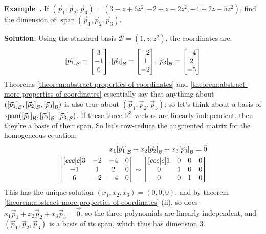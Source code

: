 \documentclass[11pt, letterpaper]{report}
\newenvironment{notes}{}{}
\newenvironment{book}{}{}
\let\originalleft\left
\let\originalright\right
\renewcommand{\left}{\mathopen{}\mathclose\bgroup\originalleft}
\renewcommand{\right}{\aftergroup\egroup\originalright}
\newcounter{example}[section]
\newcommand{\example}{\refstepcounter{example}%
\par\noindent\textbf{Example~\theexample.} }
\newcounter{theorem}[chapter]
\newcommand{\R}{\mathbb{R}}
\DeclareMathOperator{\spn}{span}
\newcommand{\bbbvec}[3]{
  \begin{bmatrix} #1 \\ #2 \\ #3 \end{bmatrix}
}
\begin{document}
\example If $( \vec{p}_1,\vec{p}_2,\vec{p}_3 ) = ( 3-z+6z^2,-2+z-2z^2, -4 + 2z-5z^2 )$, find the dimension of $\spn ( \vec{p}_1,\vec{p}_2,\vec{p}_3 )$.

\begin{notes}
\vspace{20em}
\end{notes}

\begin{book}
\textbf{Solution.} Using the standard basis $\mathcal{B} = (1,z,z^2)$, the coordinates are:
\[\left[ \vec{p}_1 \right]_{\mathcal{B}}=\bbbvec{3}{-1}{6}, \left[ \vec{p}_2 \right]_{\mathcal{B}}=\bbbvec{-2}{1}{-2},\left[ \vec{p}_3 \right]_{\mathcal{B}}=\bbbvec{-4}{2}{-5}\]
Theorems \ref{theorem:abstract-properties-of-coordinates} and \ref{theorem:abstract-more-properties-of-coordinates} essentially say that anything about $( \left[\vec{p}_1\right]_{\mathcal{B}},\left[\vec{p}_2\right]_{\mathcal{B}},\left[\vec{p}_3\right]_{\mathcal{B}} )$ is also true about $( \vec{p}_1,\vec{p}_2,\vec{p}_3 )$; so let's think about a basis of $\spn( \left[\vec{p}_1\right]_{\mathcal{B}},\left[\vec{p}_2\right]_{\mathcal{B}},\left[\vec{p}_3\right]_{\mathcal{B}} )$. If these three $\R^3$ vectors are linearly independent, then they're a basis of their span. So let's row-reduce the augmented matrix for the homogeneous equation:
\begin{align*}
x_1\left[\vec{p}_1\right]_{\mathcal{B}}+x_2\left[\vec{p}_2\right]_{\mathcal{B}}+x_3\left[\vec{p}_3\right]_{\mathcal{B}} = \vec{0} \\
\begin{bmatrix}[ccc|c]
3 & -2 & -4 &0 \\
-1 & 1 & 2 &0 \\
6 & -2 & -4 & 0
\end{bmatrix}
\sim \begin{bmatrix}[ccc|c]
1 & 0 & 0 &0\\
0 & 1 & 0 &0\\
0 & 0 & 1 &0
\end{bmatrix}
\end{align*}
This has the unique solution $(x_1,x_2,x_3) = (0,0,0)$, and by theorem \ref{theorem:abstract-more-properties-of-coordinates} (ii), so does $x_1\vec{p}_1+x_2\vec{p}_2+x_3\vec{p}_3=\vec{0}$, so the three polynomials are linearly independent, and $( \vec{p}_1,\vec{p}_2,\vec{p}_3 )$ is a basis of its span, which thus has dimension 3. \blacksquare
\end{book}
\end{document}
